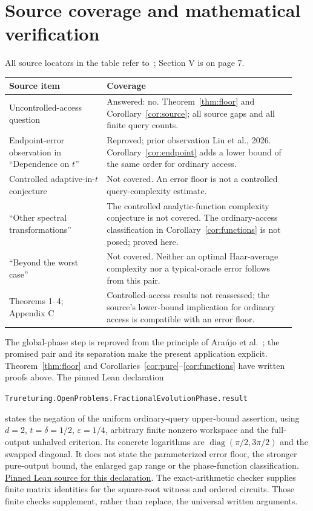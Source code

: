 \documentclass[11pt]{article}
\begin{document}
\section{Source coverage and mathematical verification}
All source locators in the table refer to~\cite{liu}; Section V is on page 7.
\begin{center}\small
\begin{tabular}{@{}>{\raggedright\arraybackslash}p{0.32\linewidth}>{\raggedright\arraybackslash}p{0.62\linewidth}@{}}
\toprule
Source item & Coverage\\
\midrule
Uncontrolled-access question & Answered: no. Theorem~\ref{thm:floor} and
Corollary~\ref{cor:source}; all source gaps and all finite query counts.\\[3pt]
Endpoint-error observation in ``Dependence on $t$'' & Reproved; prior
observation Liu et al., 2026. Corollary~\ref{cor:endpoint} adds a lower bound
of the same order for ordinary access.\\[3pt]
Controlled adaptive-in-$t$ conjecture & Not covered. An error floor is
not a controlled query-complexity estimate.\\[3pt]
``Other spectral transformations'' & The controlled analytic-function
complexity conjecture is not covered. The ordinary-access classification
in Corollary~\ref{cor:functions} is not posed; proved here.\\[3pt]
``Beyond the worst case'' & Not covered. Neither an optimal Haar-average
complexity nor a typical-oracle error follows from this pair.\\[3pt]
Theorems 1--4; Appendix C & Controlled-access results not reassessed;
the source's lower-bound implication for ordinary access is compatible
with an error floor.\\
\bottomrule
\end{tabular}
\end{center}

The global-phase step is reproved from the principle of
Ara\'ujo et al.~\cite{araujo}; the promised pair and its separation make
the present application explicit.
Theorem~\ref{thm:floor} and Corollaries~\ref{cor:pure}--\ref{cor:functions}
have written proofs above.
The pinned Lean declaration
\begin{center}\footnotesize
\texttt{Trureturing.OpenProblems.FractionalEvolutionPhase.result}
\end{center}
states the negation of the uniform ordinary-query upper-bound assertion,
using $d=2$, $t=\delta=1/2$, $\varepsilon=1/4$, arbitrary finite nonzero
workspace and the full-output unhalved criterion.
Its concrete logarithms are
$\operatorname{diag}(\pi/2,3\pi/2)$ and the swapped diagonal.
It does not state the parameterized error floor, the stronger pure-output
bound, the enlarged gap range or the phase-function classification.
\href{https://github.com/the-omega-institute/trureturing/blob/42aeb4e95344fb1ea9d2042d02ff1a5589faaacb/D5/S3/Quantum/QuantumChannels/FractionalEvolutionPhaseObstruction.lean}{Pinned Lean source for this declaration}.
The exact-arithmetic checker supplies finite matrix identities for the
square-root witness and ordered circuits. Those finite checks supplement,
rather than replace, the universal written arguments.
\end{document}
